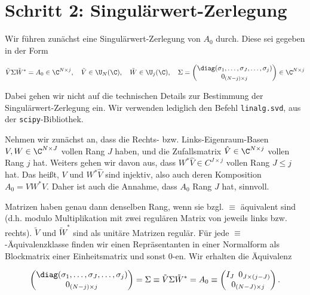 \section{Schritt 2: Singulärwert-Zerlegung}

Wir führen zunächst eine Singulärwert-Zerlegung von $A_0$ durch.
Diese sei gegeben in der Form

\begin{align*}
    \tilde V \Sigma \tilde W^\ast = A_0 \in \C^{N \times j},
    \quad
    \tilde V \in \U_N(\C),
    \quad
    \tilde W \in \U_j(\C),
    \quad
    \Sigma = \begin{pmatrix}
        \diag(\sigma_1, \dots, \sigma_J, \dots, \sigma_j) \\
        0_{(N - j) \times j}
    \end{pmatrix} \in \C^{N \times j}
\end{align*}

Dabei gehen wir nicht auf die technischen Details zur Bestimmung der Singulärwert-Zerlegung ein.
Wir verwenden lediglich den Befehl \texttt{linalg.svd}, aus der \texttt{scipy}-Bibliothek.

Nehmen wir zunächst an, dass die Rechts- bzw. Links-Eigenraum-Basen $V, W \in \C^{N \times J}$ vollen Rang $J$ haben, und die Zufallsmatrix $\hat V \in \C^{N \times j}$ vollen Rang $j$ hat.
Weiters gehen wir davon aus, dass $W^\ast \hat V \in C^{J \times j}$ vollen Rang $J \leq j$ hat.
Das heißt, $V$ und $W^\ast \hat V$ sind injektiv, also auch deren Komposition $A_0 = V W^\ast \hat V$.
Daher ist auch die Annahme, dass $A_0$ Rang $J$ hat, sinnvoll.

Matrizen haben genau dann denselben Rang, wenn sie bzgl. $\equiv$ äquivalent sind (d.h. modulo Multiplikation mit zwei regulären Matrix von jeweils links bzw. rechts).
$\tilde V$ und $\tilde W^\ast$ sind als unitäre Matrizen regulär.
Für jede $\equiv$-Äquivalenzklasse finden wir einen Repräsentanten in einer Normalform als Blockmatrix einer Einheitsmatrix und sonst $0$-en.
Wir erhalten die Äquivalenz

\begin{align*}
    \begin{pmatrix}
        \diag(\sigma_1, \dots, \sigma_J, \dots, \sigma_j) \\
        0_{(N - j) \times j}
    \end{pmatrix}
    =
    \Sigma
    \equiv
    \tilde V \Sigma \tilde W^\ast
    =
    A_0
    \equiv
    \begin{pmatrix}
        I_J \enspace 0_{J \times (j - J)} \\ 0_{(N - J) \times j}
    \end{pmatrix}.
\end{align*}

